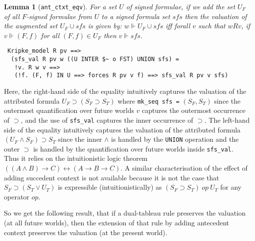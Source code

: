 \documentclass[a4paper]{article}
\newtheorem{lemma}{Lemma}
\begin{document}
\begin{lemma}[\texttt{ant\_ctxt\_eqv}] \label{ant-ctxt-eqv}
  For a set $U$ of signed formulae, if
  we add the set $U_F$ of all $F$-signed formulae from $U$
  to a signed formula set $\textit{sfs}$
  then the valuation of the augmented set
  $U_F \cup \textit{sfs}$ is given by:
  $w \Vdash U_F \cup \textit{sfs}$ iff
  forall $v$ such that $wRv$,
  if $v \Vdash (F,f)$ for all $(F,f) \in U_F$
  then $v \Vdash \textit{sfs}$.
\end{lemma}
\begin{verbatim}
 Kripke_model R pv ==> 
  (sfs_val R pv w ((U INTER $~ o FST) UNION sfs) =
   !v. R w v ==> 
   (!f. (F, f) IN U ==> forces R pv v f) ==> sfs_val R pv v sfs)
\end{verbatim}


Here, the right-hand side of the equality 
intuitively captures the valuation of the attributed formula
$U_F \supset (S_F \supset S_T)$ where
\texttt{mk\_seq sfs =} $(S_F, S_T)$
since the outermost quantification over future worlds $v$ captures the
outermost occurrence of $\supset$, and the use of \texttt{sfs\_val}
captures the inner occurrence of $\supset$.
The left-hand side of the equality intuitively captures the valuation
of the attributed formula
$(U_F \land S_F) \supset S_T$
since the inner $\land$ is handled by the
\texttt{UNION} operation and the outer $\supset$ is handled by the
quantification over future worlds inside \texttt{sfs\_val}.
Thus it relies on the intuitionistic logic theorem
$((A \land B) \to C) \leftrightarrow (A \to B \to C)$.
A similar characterisation of the effect of adding succedent
context is not available because it is not the case that $S_F \supset (S_T
\lor U_T)$ is expressible (intuitionistically) as $(S_F \supset S_T) ~op~
U_T$ for any operator $op$.

So we get the following result, that if a dual-tableau rule preserves the
valuation (at all future worlds), then the extension of that rule by
adding antecedent context preserves the valuation (at the present
world).
\end{document}
